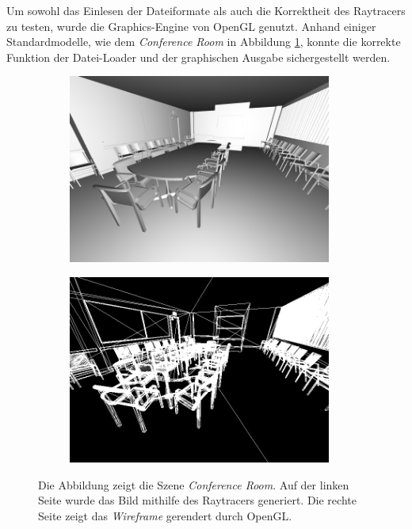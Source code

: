 \documentclass[crop=false]{standalone}
\begin{document}
        Um sowohl das Einlesen der Dateiformate als auch die Korrektheit des Raytracers zu testen, wurde die Graphics-Engine von OpenGL genutzt.
        Anhand einiger Standardmodelle, wie dem \textit{Conference Room} in Abbildung \ref{fig:raytracer-example}, konnte die korrekte Funktion der Datei-Loader und der graphischen Ausgabe sichergestellt werden.
        \begin{figure}
          \center
          \begin{subfigure}[b]{0.49\textwidth}
            \center
            \includegraphics[width=0.95\textwidth]{images/ray_tracer_example.png}
          \end{subfigure}
          \begin{subfigure}[b]{0.49\textwidth}
            \center
            \includegraphics[width=0.95\textwidth]{images/opengl_example.png}
          \end{subfigure}
          \caption{%
            Die Abbildung zeigt die Szene \textit{Conference Room}.
            Auf der linken Seite wurde das Bild mithilfe des Raytracers generiert.
            Die rechte Seite zeigt das \textit{Wireframe} gerendert durch OpenGL.
          }
          \label{fig:raytracer-example}
        \end{figure}
\end{document}
